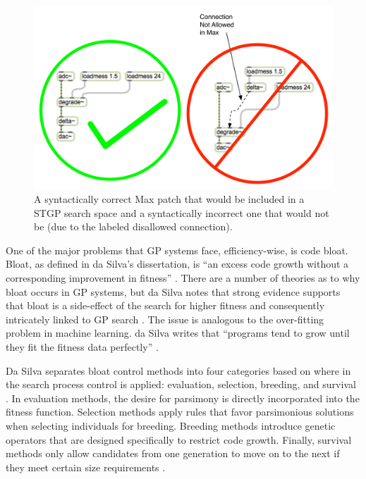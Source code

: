 \documentclass[12pt]{report} 	%
\numberwithin{figure}{chapter}
\numberwithin{table}{chapter}
\numberwithin{equation}{chapter}
\begin{document}
\begin{flushleft}
\begin{figure}[h!]
\begin{center}
\includegraphics[scale=0.70]{SyntacticCorrectness}
\caption[Strongly-typed genetic programming]{A syntactically correct Max patch that would be included in a STGP search space and a syntactically incorrect one that would not be (due to the labeled disallowed connection).}
\end{center}
\end{figure}
One of the major problems that GP systems face, efficiency-wise, is code bloat. Bloat, as defined in da Silva's dissertation, is ``an excess code growth without a corresponding improvement in fitness'' \cite[p. 2]{Silva:2008le}. There are a number of theories as to why bloat occurs in GP systems, but da Silva notes that strong evidence supports that bloat is a side-effect of the search for higher fitness and consequently intricately linked to GP search \cite[p. 9]{Silva:2008le}. The issue is analogous to the over-fitting problem in machine learning. da Silva writes that ``programs tend to grow until they fit the fitness data perfectly'' \cite[p. 9]{Silva:2008le}.

Da Silva separates bloat control methods into four categories based on where in the search process control is applied: evaluation, selection, breeding, and survival \cite[p. 11]{Silva:2008le}. In evaluation methods, the desire for parsimony is directly incorporated into the fitness function. Selection methods apply rules that favor parsimonious solutions when selecting individuals for breeding. Breeding methods introduce genetic operators that are designed specifically to restrict code growth. Finally, survival methods only allow candidates from one generation to move on to the next if they meet certain size requirements \cite[p. 11-12]{Silva:2008le}. 


\end{flushleft}
\end{document}
